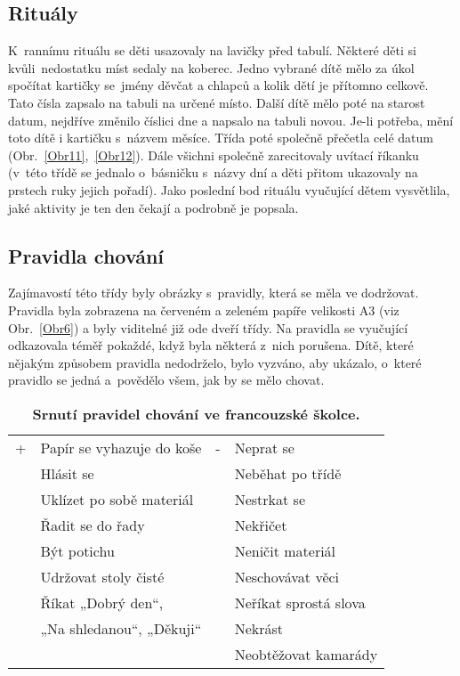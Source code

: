 		\subsection{Rituály}
		\label{ritualy}
			K~rannímu rituálu se děti usazovaly na lavičky před tabulí. Některé děti si kvůli nedostatku míst sedaly na koberec. Jedno vybrané dítě mělo za úkol spočítat kartičky se jmény děvčat a chlapců a kolik dětí je přítomno celkově. Tato čísla zapsalo na tabuli na určené místo. Další dítě mělo poté na starost datum, nejdříve změnilo číslici dne a napsalo na tabuli novou. Je-li potřeba, mění toto dítě i kartičku s~názvem měsíce. Třída poté společně přečetla celé datum (Obr.~\ref{Obr11},~\ref{Obr12}). Dále všichni společně zarecitovaly uvítací říkanku (v~této třídě se jednalo o~básničku s názvy dní a děti přitom ukazovaly na prstech ruky jejich pořadí). Jako poslední bod rituálu vyučující dětem vysvětlila, jaké aktivity je ten den čekají a podrobně je popsala. 

		\subsection{Pravidla chování}
		\label{pravidlaChovani}
			Zajímavostí této třídy byly obrázky s~pravidly, která se měla ve dodržovat. Pravidla byla zobrazena na červeném a zeleném papíře velikosti A3 (viz Obr.~\ref{Obr6}) a byly viditelné již ode dveří třídy. Na pravidla se vyučující odkazovala téměř pokaždé, když byla některá z nich porušena. Dítě, které nějakým způsobem pravidla nedodrželo, bylo vyzváno, aby ukázalo, o~které pravidlo se jedná a povědělo všem, jak by se mělo chovat. 

			\begin{spacing}{1.0}
			\begin{table}[h!]
				\center
				\begin{tabular}{|ll|ll|}
					\hline
					\rowcolor{grey!0}
				+	& Papír se vyhazuje do koše						& -	& Neprat se 			\\
					& Hlásit se 									&  	& Neběhat po třídě		\\
					& Uklízet po sobě materiál 						&	& Nestrkat se 			\\
					& Řadit se do řady 								&	& Nekřičet 				\\
					& Být potichu 									& 	& Neničit materiál 		\\
					& Udržovat stoly čisté 							& 	& Neschovávat věci 		\\
					& Říkat „Dobrý den“,							&	& Neříkat sprostá slova \\
					&  „Na shledanou“, „Děkuji“						&	& Nekrást				\\
					&												&	& Neobtěžovat kamarády 	\\
					\hline
				\end{tabular}
				\caption{ \textbf{Srnutí pravidel chování ve francouzské školce.}}
			\label{tab:pravidlaFR}
			\end{table}
			\end{spacing}

